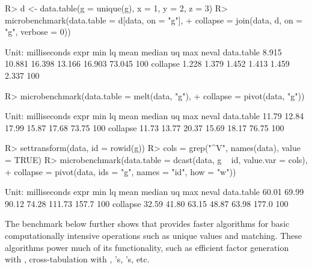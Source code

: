 \documentclass[article]{jss}
\newcommand{\fct}[1]{\code{#1()}}
\begin{document}
\begin{Schunk}
\begin{Soutput}
\end{Soutput}
\begin{Sinput}
R> d <- data.table(g = unique(g), x = 1, y = 2, z = 3)
R> microbenchmark(data.table = d[data, on = "g"],
+                 collapse = join(data, d, on = "g", verbose = 0))
\end{Sinput}
\begin{Soutput}
Unit: milliseconds
       expr   min     lq   mean median     uq    max neval
 data.table 8.915 10.881 16.398 13.166 16.903 73.045   100
   collapse 1.228  1.379  1.452  1.413  1.459  2.337   100
\end{Soutput}
\begin{Sinput}
R> microbenchmark(data.table = melt(data, "g"),
+                 collapse = pivot(data, "g"))
\end{Sinput}
\begin{Soutput}
Unit: milliseconds
       expr   min    lq  mean median    uq   max neval
 data.table 11.79 12.84 17.99  15.87 17.68 73.75   100
   collapse 11.73 13.77 20.37  15.69 18.17 76.75   100
\end{Soutput}
\begin{Sinput}
R> settransform(data, id = rowid(g))
R> cols = grep("^V", names(data), value = TRUE)
R> microbenchmark(data.table = dcast(data, g ~ id, value.var = cols),
+            collapse = pivot(data, ids = "g", names = "id", how = "w"))
\end{Sinput}
\begin{Soutput}
Unit: milliseconds
       expr   min    lq  mean median     uq   max neval
 data.table 60.01 69.99 90.12  74.28 111.73 157.7   100
   collapse 32.59 41.80 63.15  48.87  63.98 177.0   100
\end{Soutput}
\end{Schunk}
%
The benchmark below further shows that  provides faster algorithms for basic computationally intensive operations such as unique values and matching. These algorithms power much of its functionality, such as efficient factor generation with \fct{qF}, cross-tabulation with \fct{qtab}, \fct{join}'s, \fct{pivot}'s, etc.
%
\end{document}
